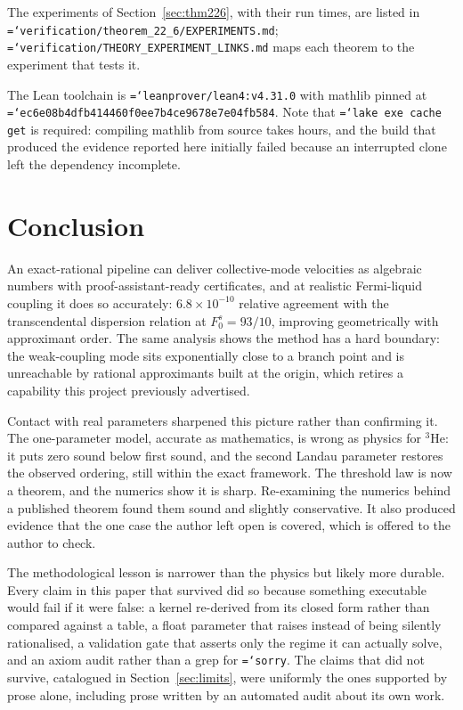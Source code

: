 \documentclass[11pt,a4paper]{article}
\newcommand{\Fzs}{F_0^{s}}
\newcommand{\code}[1]{\texttt{\hyphenchar\font=`\-\relax #1}}
\begin{document}
The experiments of Section~\ref{sec:thm226}, with their run times, are listed in
\code{verification/theorem\_22\_6/EXPERIMENTS.md}; \code{verification/THEORY\_EXPERIMENT\_LINKS.md}
maps each theorem to the experiment that tests it.

The Lean toolchain is \code{leanprover/lean4:v4.31.0} with mathlib pinned at
\code{ec6e08b4dfb4\-14460f0ee7\-b4ce9678e7\-e04fb584}. Note that
\code{lake exe cache get} is required: compiling mathlib from source takes hours,
and the build that produced the evidence reported here initially failed because
an interrupted clone left the dependency incomplete.

\section{Conclusion}

An exact-rational pipeline can deliver collective-mode velocities as algebraic
numbers with proof-assistant-ready certificates, and at realistic Fermi-liquid
coupling it does so accurately: $6.8\times10^{-10}$ relative agreement with the
transcendental dispersion relation at $\Fzs = 93/10$, improving geometrically
with approximant order. The same analysis shows the method has a hard boundary:
the weak-coupling mode sits exponentially close to a branch point and is
unreachable by rational approximants built at the origin, which retires a
capability this project previously advertised.

Contact with real parameters sharpened this picture rather than confirming it. The
one-parameter model, accurate as mathematics, is wrong as physics for $^3$He: it puts zero
sound below first sound, and the second Landau parameter restores the observed ordering, still
within the exact framework. The threshold law is now a theorem, and the numerics show it is
sharp. Re-examining the numerics behind a published theorem found them sound and slightly
conservative. It also produced evidence that the one case the author left open is covered, which
is offered to the author to check.

The methodological lesson is narrower than the physics but likely more durable.
Every claim in this paper that survived did so because something executable
would fail if it were false: a kernel re-derived from its closed form rather
than compared against a table, a float parameter that raises instead of being
silently rationalised, a validation gate that asserts only the regime it can
actually solve, and an axiom audit rather than a grep for \code{sorry}. The
claims that did not survive, catalogued in Section~\ref{sec:limits}, were
uniformly the ones supported by prose alone, including prose written by an
automated audit about its own work.
\end{document}
